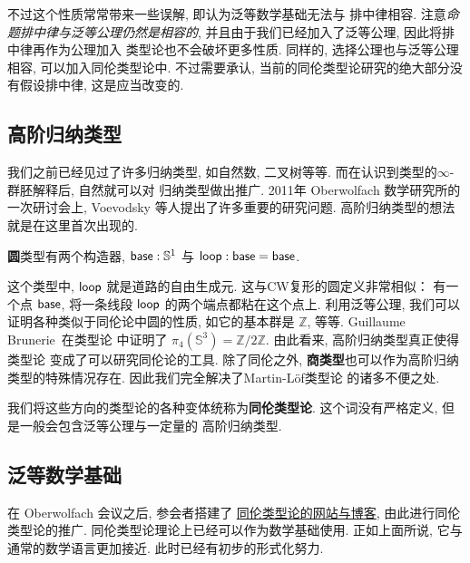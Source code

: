 不过这个性质常常带来一些误解, 即认为泛等数学基础无法与
排中律相容. 注意\emph{命题排中律与泛等公理仍然是相容的},
并且由于我们已经加入了泛等公理, 因此将排中律再作为公理加入
类型论也不会破坏更多性质. 同样的, 选择公理也与泛等公理相容,
可以加入同伦类型论中.
不过需要承认, 当前的同伦类型论研究的绝大部分没有假设排中律, 这是应当改变的.

\subsection{高阶归纳类型}
我们之前已经见过了许多归纳类型, 如自然数, 二叉树等等.
而在认识到类型的\(\infty\)-群胚解释后, 自然就可以对
归纳类型做出推广. 2011年 Oberwolfach 数学研究所的
一次研讨会上, Voevodsky 等人提出了许多重要的研究问题.
高阶归纳类型的想法就是在这里首次出现的.

\begin{definition}
\textbf{圆}类型有两个构造器, \(\textnormal{\textsf{base}} : \mathbb S^1\)
与 \(\textnormal{\textsf{loop}} : \textnormal{\textsf{base}} = \textnormal{\textsf{base}}\).
\end{definition}
这个类型中, \(\textnormal{\textsf{loop}}\) 就是道路的自由生成元.
这与CW复形的圆定义非常相似： 有一个点 \(\textnormal{\textsf{base}}\),
将一条线段 \(\textnormal{\textsf{loop}}\) 的两个端点都粘在这个点上.
利用泛等公理, 我们可以证明各种类似于同伦论中圆的性质,
如它的基本群是 \(\mathbb Z\), 等等.
Guillaume Brunerie~\cite{brunerie:2016:number}在类型论
中证明了 \(\pi_4(\mathbb S^3) = \mathbb Z / 2\mathbb Z\).
由此看来, 高阶归纳类型真正使得类型论
变成了可以研究同伦论的工具.
除了同伦之外, \textbf{商类型}也可以作为高阶归纳
类型的特殊情况存在. 因此我们完全解决了Martin-L\"of类型论
的诸多不便之处.

我们将这些方向的类型论的各种变体统称为\textbf{同伦类型论}.
这个词没有严格定义, 但是一般会包含泛等公理与一定量的
高阶归纳类型.

\subsection{泛等数学基础}
在 Oberwolfach 会议之后, 参会者搭建了%
\href{http://homotopytypetheory.org/}{同伦类型论的网站与博客},
由此进行同伦类型论的推广.
同伦类型论理论上已经可以作为数学基础使用. 正如上面所说, 它与
通常的数学语言更加接近. 此时已经有初步的形式化努力.

